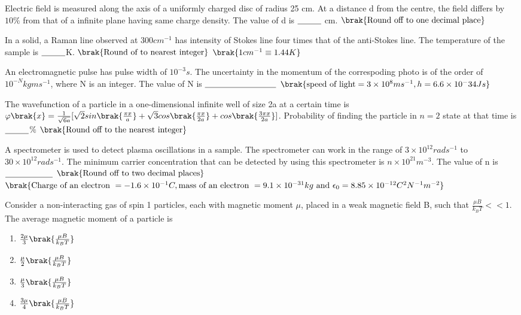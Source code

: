 \item Electric field is measured along the axis of a uniformly charged disc of radius 25 cm. At a distance d from the centre, the field differs by $10\%$ from that of a infinite plane having same charge density. The value of d is $\makebox[1cm][l]{\underline{\hspace{1cm}}}$ cm.
$\brak{\text{Round off to one decimal place}}$

\item In a solid, a Raman line observed at $300 cm^{-1}$ has intensity of Stokes line four times that of the anti-Stokes line. The temperature of the sample is $\makebox[1cm][l]{\underline{\hspace{1cm}}}$K.
$\brak{\text{Round of to nearest integer}}$
$\brak{1cm^{-1} \equiv 1.44K}$

\item An electromagnetic pulse has pulse width of $10^{-3} s$. The uncertainty in the momentum of the correspoding photo is of the order of $10^{-N} kg m s^{-1}$, where N is an integer. The value of N is $\makebox[3cm][l]{\underline{\hspace{3cm}}}$ 
$\brak{\text{speed of light}= 3 \times 10^8 m s^{-1}, h= 6.6 \times 10^-34 Js}$

\item The wavefunction of a particle in a one-dimensional infinite well of size 2a at a certain time is $\varphi \brak{x} = \frac{1}{\sqrt{6a}}[\sqrt{2}sin\brak{\frac{\pi x}{a}} + \sqrt{3}cos\brak{\frac{\pi x}{2a}} + cos\brak{\frac{3\pi x}{2a}}]$. Probability of finding the particle in $n=2$ state at that time is $\makebox[1cm][l]{\underline{\hspace{1cm}}}$$\%$ 
$\brak{\text{Round off to the nearest integer}}$

\item A spectrometer is used to detect plasma oscillations in a sample. The spectrometer can work in the range of $3 \times 10^{12} rad s^{-1}$ to $30 \times 10^{12} rad s^{-1}$. The minimum carrier concentration that can be detected by using this spectrometer is $n \times 10^{21} m^{-3}$. The value of n is $\makebox[2cm][l]{\underline{\hspace{2cm}}}$
$\brak{\text{Round off to two decimal places}}$
$\brak{\text{Charge of an electron }= -1.6 \times 10^{-1}C, \text{mass of an electron }= 9.1 \times 10^{-31}kg \text{ and } \epsilon_0 = 8.85 \times 10^{-12} C^2 N^{-1} m^{-2}}$

\item Consider a non-interacting gas of spin 1 particles, each with magnetic moment $\mu$, placed in a weak magnetic field B, such that $\frac{\mu B}{k_B T} << 1$. The average magnetic moment of a particle is 
\begin{enumerate}
    \item $\frac{2\mu}{3} \brak{\frac{\mu B}{k_B T}}$
    \item $\frac{\mu}{2} \brak{\frac{\mu B}{k_B T}}$
    \item $\frac{\mu}{3} \brak{\frac{\mu B}{k_B T}}$
    \item $\frac{3\mu}{4} \brak{\frac{\mu B}{k_B T}}$
\end{enumerate}

